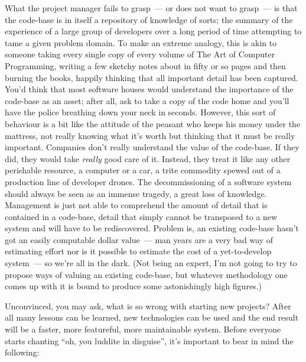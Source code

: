 \documentclass{memoir}
\begin{document}
What the project manager fails to grasp~--- or does not want to
grasp~--- is that the code-base is in itself a repository of knowledge
of sorts; the summary of the experience of a large group of developers
over a long period of time attempting to tame a given problem
domain. To make an extreme analogy, this is akin to someone taking
every single copy of every volume of The Art of Computer Programming,
writing a few sketchy notes about in fifty or so pages and then
burning the books, happily thinking that all important detail has been
captured. You'd think that most software houses would understand the
importance of the code-base as an asset; after all, ask to take a copy
of the code home and you'll have the police breathing down your neck
in seconds. However, this sort of behaviour is a bit like the attitude
of the peasant who keeps his money under the mattress, not really
knowing what it's worth but thinking that it must be really
important. Companies don't really understand the value of the
code-base. If they did, they would take \emph{really} good care of
it. Instead, they treat it like any other perishable resource, a
computer or a car, a trite commodity spewed out of a production line
of developer drones. The decommissioning of a software system should
always be seen as an immense tragedy, a great loss of
knowledge. Management is just not able to comprehend the amount of
detail that is contained in a code-base, detail that simply cannot be
transposed to a new system and will have to be rediscovered. Problem
is, an existing code-base hasn't got an easily computable dollar
value~--- man years are a very bad way of estimating effort nor is it
possible to estimate the cost of a yet-to-develop system~--- so we're
all in the dark. (Not being an expert, I'm not going to try to propose
ways of valuing an existing code-base, but whatever methodology one
comes up with it is bound to produce some astonishingly high figures.)

Unconvinced, you may ask, what is so wrong with starting new projects?
After all many lessons can be learned, new technologies can be used
and the end result will be a faster, more featureful, more
maintainable system. Before everyone starts chanting ``oh, you luddite
in disguise'', it's important to bear in mind the following:
\end{document}
